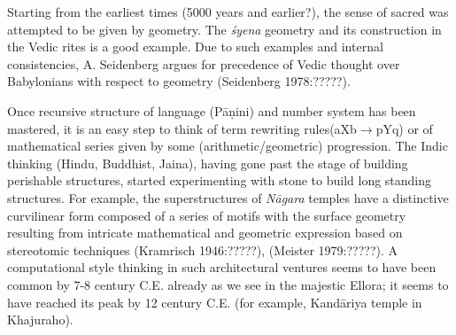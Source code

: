 Starting from the earliest times (5000 years and earlier?), the sense of sacred was attempted to be given by geometry. The \textsl{śyena} geometry and its construction in the Vedic rites is a good example. Due to such examples and internal consistencies, A. Seidenberg argues for precedence of Vedic thought over Babylonians with respect to geometry (Seidenberg 1978:?????).

Once recursive structure of language (Pāṇini) and number system has been mastered, it is an easy step to think of term rewriting rules\break (aXb$\to$pYq) or of mathematical series given by some (arithmetic/geo\-metric) progression. The Indic thinking (Hindu, Buddhist, Jaina), having gone past the stage of building perishable structures, started experimenting with stone to build long standing structures. For example, the superstructures of \textsl{Nāgara} temples have a distinctive curvilinear form composed of a series of motifs with the surface geometry resulting from intricate mathematical and geometric expression based on stereotomic techniques (Kramrisch 1946:?????), (Meister 1979:?????).  A computational style thinking in such architectural ventures seems to have been common by 7-8 century C.E. already as we see in the majestic Ellora; it seems to have reached its peak by 12 century C.E. (for example, Kandāriya temple in Khajuraho).

